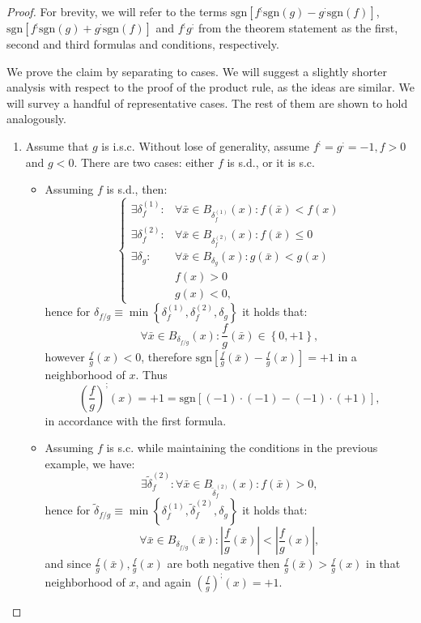 \documentclass[11pt]{book}
\begin{document}
\begin{proof}For brevity, we will refer to the terms $\text{sgn}\left[f^{;}\text{sgn}\left(g\right)-g^{;}\text{sgn}\left(f\right)\right]$, $\text{sgn}\left[f^{;}\text{sgn}\left(g\right)+g^{;}\text{sgn}\left(f\right)\right]$ and $f^{;}g^{;}$ from the theorem statement as the first, second and third formulas and conditions, respectively.

We prove the claim by separating to cases. We will suggest a slightly shorter analysis with respect to the proof of the product rule, as the ideas are similar. We will survey a handful of representative cases. The rest of them are shown to hold analogously.

\begin{enumerate}

\item Assume that $g$ is i.s.c. Without lose of generality, assume $f^{;}=g^{;}=-1,f>0$ and $g<0$. There are two cases: either $f$ is s.d., or it is s.c.
\begin{itemize}

\item Assuming $f$ is s.d., then:$$\begin{cases}\exists\delta_{f}^{\left(1\right)}: & \forall\bar{x}\in B_{\delta_{f}^{\left(1\right)}}\left(x\right):f\left(\bar{x}\right)< f\left(x\right)\\\exists\delta_{f}^{\left(2\right)}: & \forall\bar{x}\in B_{\delta_{f}^{\left(2\right)}}\left(x\right):f\left(\bar{x}\right)\leq0\\\exists\delta_{g}: & \forall\bar{x}\in B_{\delta_{g}}\left(x\right):g\left(\bar{x}\right)< g\left(x\right)\\ & f\left(x\right)>0\\& g\left(x\right)<0,\end{cases}$$
hence for $\delta_{f/g}\equiv\min\left\{ \delta_{f}^{\left(1\right)},\delta_{f}^{\left(2\right)},\delta_{g}\right\}$ it holds that:
$$\forall\bar{x}\in B_{\delta_{f/g}}\left(x\right):\frac{f}{g}\left(\bar{x}\right)\in\left\{ 0,+1\right\},$$
however $\frac{f}{g}\left(x\right)<0$, therefore $\text{sgn}\left[\frac{f}{g}\left(\bar{x}\right)-\frac{f}{g}\left(x\right)\right]=+1$ in a neighborhood of $x$. Thus $$\left(\frac{f}{g}\right)^{;}\left(x\right)=+1=\text{sgn}\left[\left(-1\right)\cdot\left(-1\right)-\left(-1\right)\cdot\left(+1\right)\right],$$ in accordance with the first formula.
\item Assuming $f$ is s.c. while maintaining the conditions in the previous example, we have: $$\exists\tilde{\delta}_{f}^{\left(2\right)}:\forall\bar{x}\in B_{\tilde{\delta}_{f}^{\left(2\right)}}\left(x\right):f\left(\bar{x}\right)>0,$$
hence for $\tilde{\delta}{}_{f/g}\equiv\min\left\{ \delta_{f}^{\left(1\right)},\tilde{\delta}_{f}^{\left(2\right)},\delta_{g}\right\}$ it holds that:$$\forall\bar{x}\in B_{\delta_{f/g}}\left(\bar{x}\right):\left|\frac{f}{g}\left(\bar{x}\right)\right|<\left|\frac{f}{g}\left(x\right)\right|,$$ and since $\frac{f}{g}\left(\bar{x}\right),\frac{f}{g}\left(x\right)$ are both negative then $\frac{f}{g}\left(\bar{x}\right)>\frac{f}{g}\left(x\right)$ in that neighborhood of $x$, and again $\left(\frac{f}{g}\right)^{;}\left(x\right)=+1$.
\end{itemize}


\end{enumerate}
\end{proof}
\end{document}
